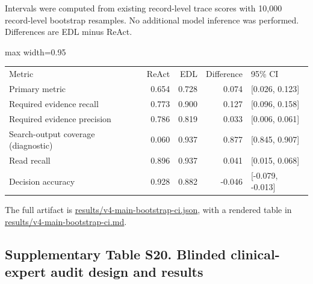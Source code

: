 \documentclass[
  8pt,
]{extarticle}
\begin{document}
Intervals were computed from existing record-level trace scores with
10,000 record-level bootstrap resamples. No additional model inference
was performed. Differences are EDL minus ReAct.

\begin{center}
\begin{adjustbox}{max width=0.95\textwidth}
\begin{tabular}{@{}
lrrrl@{}}
\toprule\noalign{}
Metric & ReAct & EDL & Difference & 95\% CI \\

Primary metric & 0.654 & 0.728 & 0.074 & {[}0.026, 0.123{]} \\
Required evidence recall & 0.773 & 0.900 & 0.127 & {[}0.096, 0.158{]} \\
Required evidence precision & 0.786 & 0.819 & 0.033 & {[}0.006,
0.061{]} \\
Search-output coverage (diagnostic) & 0.060 & 0.937 & 0.877 & {[}0.845,
0.907{]} \\
Read recall & 0.896 & 0.937 & 0.041 & {[}0.015, 0.068{]} \\
Decision accuracy & 0.928 & 0.882 & -0.046 & {[}-0.079, -0.013{]} \\
\bottomrule
\end{tabular}
\end{adjustbox}
\end{center}

The full artifact is \url{results/v4-main-bootstrap-ci.json}, with a
rendered table in \url{results/v4-main-bootstrap-ci.md}.

\hypertarget{supplementary-table-s20-blinded-clinical-expert-audit-design-and-results}{%
\subsection{Supplementary Table S20. Blinded clinical-expert audit
design and
results}\label{supplementary-table-s20-blinded-clinical-expert-audit-design-and-results}}
\end{document}
